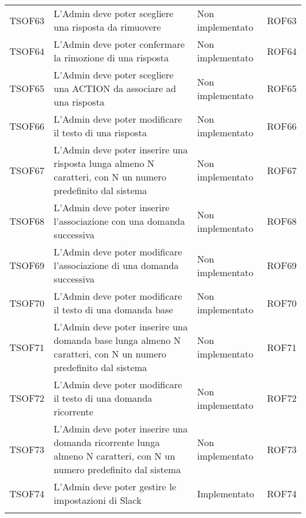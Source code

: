 \documentclass[../PianoDiQualifica_v3.0.0.tex]{subfiles}
\begin{document}
\begin{longtable}[c] { >{\centering\arraybackslash}p{2cm} p{7cm} >{\centering\arraybackslash}p{4cm} >{\centering\arraybackslash}p{2cm}}
			\addlinespace[0.3em]
			\midrule
			\addlinespace[0.3em]
			TSOF63 & L'Admin deve poter scegliere una risposta da rimuovere & Non implementato & ROF63 \\
			\addlinespace[0.3em]
			\midrule
			\addlinespace[0.3em]
			TSOF64 & L'Admin deve poter confermare la rimozione di una risposta & Non implementato & ROF64 \\
			\addlinespace[0.3em]
			\midrule
			\addlinespace[0.3em]
			TSOF65 & L'Admin deve poter scegliere una ACTION da associare ad una risposta & Non implementato & ROF65 \\
			\addlinespace[0.3em]
			\midrule
			\addlinespace[0.3em]
			TSOF66 & L'Admin deve poter modificare il testo di una risposta & Non implementato & ROF66 \\
			\addlinespace[0.3em]
			\midrule
			\addlinespace[0.3em]
			TSOF67 & L'Admin deve poter inserire una risposta lunga almeno N caratteri, con N un numero predefinito dal sistema & Non implementato & ROF67 \\
			\addlinespace[0.3em]
			\midrule
			\addlinespace[0.3em]
			TSOF68 & L'Admin deve poter inserire l'associazione con una domanda successiva & Non implementato & ROF68 \\
			\addlinespace[0.3em]
			\midrule
			\addlinespace[0.3em]
			TSOF69 & L'Admin deve poter modificare l'associazione di una domanda successiva	 & Non implementato & ROF69 \\
			\addlinespace[0.3em]
			\midrule
			\addlinespace[0.3em]
			TSOF70 & L'Admin deve poter modificare il testo di una domanda base & Non implementato & ROF70 \\
			\addlinespace[0.3em]
			\midrule
			\addlinespace[0.3em]
			TSOF71 & L'Admin deve poter inserire una domanda base lunga almeno N caratteri, con N un numero predefinito dal sistema & Non implementato & ROF71 \\
			\addlinespace[0.3em]
			\midrule
			\addlinespace[0.3em]
			TSOF72 & L'Admin deve poter modificare il testo di una domanda ricorrente & Non implementato & ROF72 \\
			\addlinespace[0.3em]
			\midrule
			\addlinespace[0.3em]
			TSOF73 & L’Admin deve poter inserire una domanda ricorrente lunga almeno N caratteri, con N un numero predefinito dal sistema & Non implementato & ROF73 \\
			\addlinespace[0.3em]
			\midrule
			\addlinespace[0.3em]
			TSOF74 & L'Admin deve poter gestire le impostazioni di Slack & Implementato & ROF74 \\
			\addlinespace[0.3em]

\end{longtable}
\end{document}
